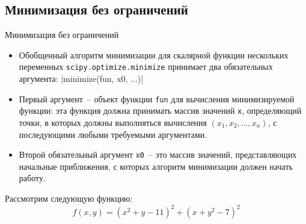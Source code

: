 \documentclass[aspectratio=169, mathserif]{beamer}	%
\begin{document}
\subsection{Минимизация без ограничений}
\begin{frame}[fragile]{Минимизация без ограничений}
\scriptsize
\begin{itemize}
\item Обобщенный алгоритм минимизации для скалярной функции нескольких переменных \texttt{scipy.optimize.minimize} принимает два обязательных аргумента:
\vfill
{}|minimize(fun, x0, ...)|
\vfill
\item Первый аргумент~-- объект функции \texttt{fun} для вычисления минимизируемой функции: эта функция должна принимать массив значений \texttt{x}, определяющий точки, в которых должны выполняться вычисления $(x_1, x_2, \ldots, x_n)$, с последующими любыми требуемыми аргументами.
\item Второй обязательный аргумент \texttt{x0}~-- это массив значений, представляющих начальные приближения, с которых алгоритм минимизации должен начать работу.
\end{itemize}
\vfill
Рассмотрим следующую функцию:
\begin{equation}
	f\left(x, y\right) = \left(x^2 + y - 11\right)^2 + \left(x + y^2 - 7\right)^2
\end{equation}
\vfill
\end{frame}
\end{document}
